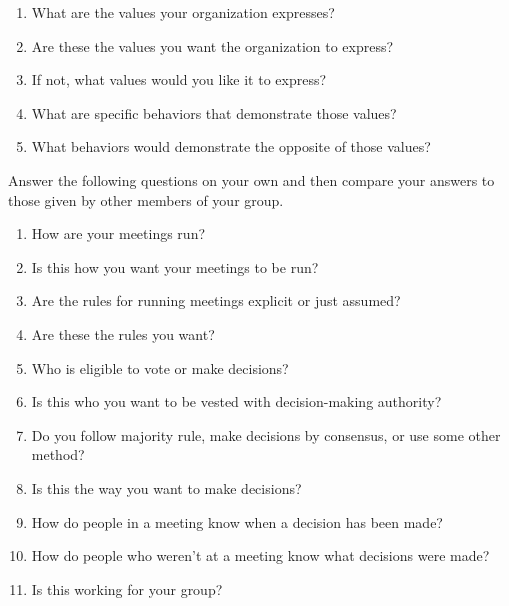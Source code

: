 \begin{enumerate}

\item
  What are the values your organization expresses?

\item
  Are these the values you want the organization to express?

\item
  If not, what values would you like it to express?

\item
  What are specific behaviors that demonstrate those values?

\item
  What behaviors would demonstrate the opposite of those values?
\end{enumerate}


Answer the following questions on your own
and then compare your answers to those given by other members of your group.

\begin{enumerate}

\item
  How are your meetings run?

\item
  Is this how you want your meetings to be run?

\item
  Are the rules for running meetings explicit or just assumed?

\item
  Are these the rules you want?

\item
  Who is eligible to vote or make decisions?

\item
  Is this who you want to be vested with decision-making authority?

\item
  Do you follow majority rule,
  make decisions by consensus,
  or use some other method?

\item
  Is this the way you want to make decisions?

\item
  How do people in a meeting know when a decision has been made?

\item
  How do people who weren't at a meeting know what decisions were made?

\item
  Is this working for your group?

\end{enumerate}

